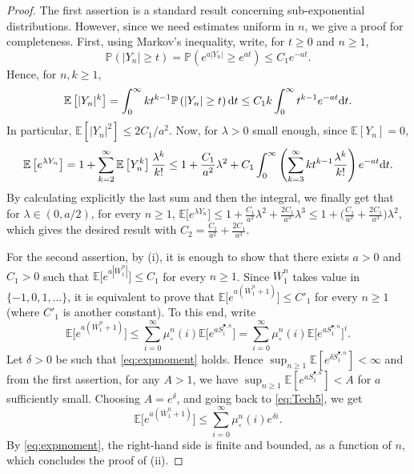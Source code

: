 \documentclass[10pt]{amsart}
\theoremstyle{definition}\newtheorem{defi}[theo]{Definition}\newtheorem{rema}[theo]{Remark}\newtheorem{exam}[theo]{Example}\newtheorem{exem}[theo]{Example}\newtheorem{nota}[theo]{Notation}
\renewcommand{\P}{\mathbb{P}}
\newcommand{\E}{\mathbb{E}}
\def\d{{\rm d}}
\def\mucn{\mu_{\circ}^{n}}
\def\Sbn{S^{\bullet,n}}
\newcommand\Es[1]{\mathbb{E}\left[#1\right]}
\renewcommand\Pr[1]{\mathbb{P}\left(#1\right)}
\begin{document}
 \begin{proof}
 The first assertion is a standard result concerning sub-exponential distributions. However, since we need estimates uniform in $n$, we give a proof for completeness. First,  using Markov's inequality, write, for $t \geq 0$ and $n \geq 1$,
 \[\P(|Y_{n}| \geq t)= \P(e^{a|Y_{n}|} \geq e^{at}) \leq C_{1} e^{-at}.\]
 Hence, for $n,k \geq 1$,
 \[\Es{|Y_{n}|^{k}}=\int_{0}^{\infty} k t^{k-1} \Pr{|Y_{n}| \geq t} {\d}t \leq  C_{1} k \int_{0}^{\infty} t^{k-1} e^{-a t} {\d}t.\]
 In particular, $\Es{|Y_{n}|^{2}} \leq 2C_{1}/a^{2}$.
 Now, for $\lambda>0$ small enough, since $\E[Y_{n}]=0$,
 \[ \Es{e^{\lambda Y_{n}}}=1+ \sum_{k=2}^{\infty} \Es{Y_{n}^{k}} \frac{\lambda^{k}}{k!}  \leq 1+ \frac{C_{1}}{a^{2}} \lambda^{2}+  C_{1}  \int_{0}^{\infty}  \left( \sum_{k=3}^{\infty}  kt^{k-1} \frac{\lambda^{k}}{k!} \right) e^{-a t} {\d}t.\]
 By calculating explicitly the last sum and then the integral, we finally get that for $\lambda \in (0,a/2)$, for every $n \geq 1$, $\E\big[e^{\lambda Y_{n}} \big] \leq  1+ \tfrac{C_{1}}{a^{2}} \lambda^{2}+  \tfrac{2C_{1}}{a^{3}} \lambda^{3} \leq 1+ \big( \tfrac{C_{1}}{a^{2}}+ \tfrac{2C_{1}}{a^{3}} \big) \lambda^{2}$, which gives the desired result with $C_{2}= \tfrac{C_{1}}{a^{2}}+ \tfrac{2C_{1}}{a^{3}}$.
 \medskip

 For the second assertion, by (i), it is enough to show that there exists $a>0$ and $C_{1}>0$ such that $\E\big[e^{a |\overline{W}^{n}_{1}|}\big] \leq C_{1}$ for every $n \geq 1$.
 Since $\overline{W}^{n}_{1}$ takes value in $\{-1,0,1,\dots\}$, it is equivalent to prove
 that
 $\E\big[e^{a (\overline{W}^{n}_{1}+1)}\big] \leq C'_{1}$ for every $n \geq 1$
 (where $C'_1$ is another constant).
 To this end, write
 \begin{equation}
   \E\big[e^{a (\overline{W}^{n}_{1}+1)}\big]  \leq  \sum_{ i=0}^{\infty}\mucn(i)  \E \big[ e^{a \Sbn_{i}} \big] =   \sum_{ i=0}^{\infty}\mucn(i)  \E \big[e^{a \Sbn_{1}} \big]^{i}.
   \label{eq:Tech5}
 \end{equation}
 Let $\delta>0$ be such that  \eqref{eq:expmoment}  holds.
 Hence $\sup_{n \ge 1} \E[e^{\delta \Sbn_{1}}]<\infty$
 and from the first assertion,
 for any $A>1$, we have $\sup_{n \ge 1} \E[e^{a \Sbn_{1}}] <A$ for $a$ sufficiently small.
 Choosing $A=e^\delta$, and going back to \eqref{eq:Tech5}, we get
 \[\E\big[e^{a (\overline{W}^{n}_{1}+1)}\big]  \leq \sum_{ i=0}^{\infty}\mucn(i) e^{\delta i}.\]
 By \eqref{eq:expmoment}, the right-hand side is finite and bounded, as a function of $n$,
 which concludes the proof of (ii).
 \medskip


\end{proof}
\end{document}
